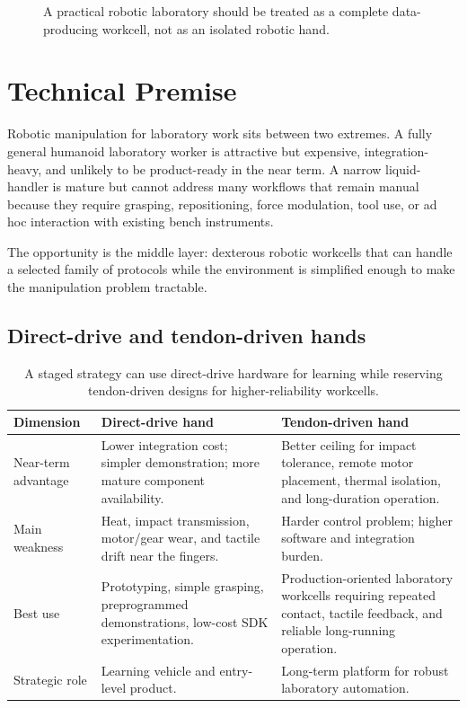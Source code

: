 \documentclass[11pt]{article}
\begin{document}
\begin{figure}[htbp]
{}
\caption{A practical robotic laboratory should be treated as a complete data-producing workcell, not as an isolated robotic hand.}
\label{fig:architecture}
\end{figure}

\section{Technical Premise}

Robotic manipulation for laboratory work sits between two extremes. A fully general humanoid laboratory worker is attractive but expensive, integration-heavy, and unlikely to be product-ready in the near term. A narrow liquid-handler is mature but cannot address many workflows that remain manual because they require grasping, repositioning, force modulation, tool use, or ad hoc interaction with existing bench instruments.

The opportunity is the middle layer: dexterous robotic workcells that can handle a selected family of protocols while the environment is simplified enough to make the manipulation problem tractable.

\subsection*{Direct-drive and tendon-driven hands}

\begin{table}[htbp]
\centering
\small
\begin{tabularx}{\linewidth}{@{}p{3.0cm}YY@{}}
\toprule
\textbf{Dimension} & \textbf{Direct-drive hand} & \textbf{Tendon-driven hand} \\
\midrule
Near-term advantage & Lower integration cost; simpler demonstration; more mature component availability. & Better ceiling for impact tolerance, remote motor placement, thermal isolation, and long-duration operation. \\
Main weakness & Heat, impact transmission, motor/gear wear, and tactile drift near the fingers. & Harder control problem; higher software and integration burden. \\
Best use & Prototyping, simple grasping, preprogrammed demonstrations, low-cost SDK experimentation. & Production-oriented laboratory workcells requiring repeated contact, tactile feedback, and reliable long-running operation. \\
Strategic role & Learning vehicle and entry-level product. & Long-term platform for robust laboratory automation. \\
\bottomrule
\end{tabularx}
\caption{A staged strategy can use direct-drive hardware for learning while reserving tendon-driven designs for higher-reliability workcells.}
\label{tab:drive}
\end{table}
\end{document}

